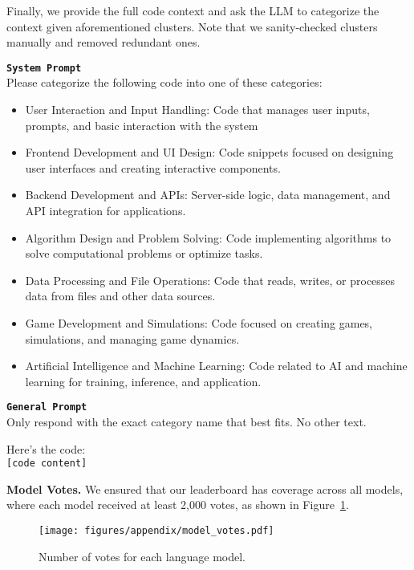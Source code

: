 Finally, we provide the full code context and ask the LLM to categorize the context given aforementioned clusters. Note that we sanity-checked clusters manually and removed redundant ones.
\begin{tcolorbox}
\texttt{\textbf{System Prompt}} \\
Please categorize the following code into one of these categories:
\begin{itemize}
    \item User Interaction and Input Handling: Code that manages user inputs, prompts, and basic interaction with the system
    \item Frontend Development and UI Design: Code snippets focused on designing user interfaces and creating interactive components.
    \item Backend Development and APIs: Server-side logic, data management, and API integration for applications.
    \item Algorithm Design and Problem Solving: Code implementing algorithms to solve computational problems or optimize tasks.
    \item Data Processing and File Operations: Code that reads, writes, or processes data from files and other data sources.
    \item Game Development and Simulations: Code focused on creating games, simulations, and managing game dynamics.
    \item Artificial Intelligence and Machine Learning: Code related to AI and machine learning for training, inference, and application.
\end{itemize}

\texttt{\textbf{General Prompt}} \\
Only respond with the exact category name that best fits. No other text.

Here's the code:\\
\texttt{[code content]}
\end{tcolorbox}
    

\textbf{Model Votes.}  We ensured that our leaderboard has coverage across all models, where each model received at least 2,000 votes, as shown in Figure~\ref{fig:model_votes}.

\begin{figure}[h]
    \centering
    \texttt{[image: figures/appendix/model\_votes.pdf]}
    \caption{Number of votes for each language model.}
    \label{fig:model_votes}
\end{figure}

